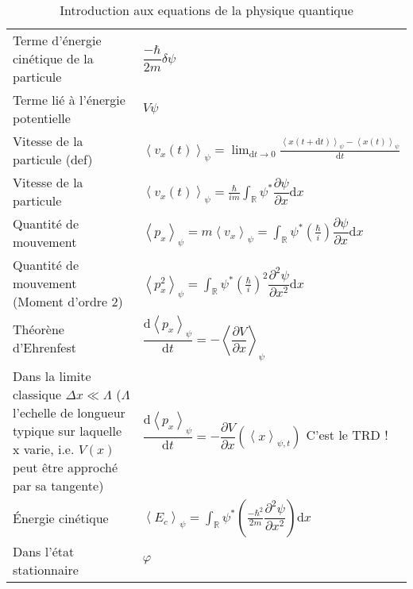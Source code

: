 \documentclass[10pt,a4paper,titlepage,portrait]{article}
\renewcommand{\d}
{
    \mathrm{d}
}
\newcommand*{\dv}[2]
{
    \dfrac{\d#1}{\d#2}
}
\newcommand*{\dpv}[2]
{
    \dfrac{\partial#1}{\partial#2}
}
\newcommand*{\ddpv}[2]
{
    \dfrac{\partial^2#1}{\partial{#2}^2}
}
\newcommand{\av}[2]
{
    \left\langle#1\right\rangle_{#2}
}
\newcommand{\lap}[1]
{
    \delta#1
}
\newcommand{\rint}
{
    \int_{\mathbb{R}}
}
\begin{document}
\begin{center}
\begin{table}[ht]
\begin{tabular}{@{}p{9cm}p{10cm}@{}}
        Terme d'énergie cinétique de la particule & $\dfrac{-\hbar}{2m}\lap{\psi}$ \\
        Terme lié à l'énergie potentielle & $V\psi$ \\
        Vitesse de la particule (def) & $\av{v_x(t)}{\psi} = \displaystyle\lim_{\d t \to0} \frac{\av{x(t+\d t)}{\psi} - \av{x(t)}{\psi}}{\d t}$ \\
        Vitesse de la particule & $\displaystyle \av{v_x(t)}{\psi} = \frac{\hbar}{im}\rint \psi^* \dpv{\psi}{x}\d x$ \\
        Quantité de mouvement & $\displaystyle \av{p_x}{\psi}=m\av{v_x}{\psi}=\rint \psi^* \left(\frac{\hbar}{i}\right) \dpv{\psi}{x}\d x$ \\
        Quantité de mouvement (Moment d'ordre 2) & $\displaystyle \av{p_x^2}{\psi}=\rint \psi^* \left(\frac{\hbar}{i}\right)^2 \ddpv{\psi}{x}\d x$ \\
        Théorène d'Ehrenfest & $\dv{\av{p_x}{\psi}}{t} = -\av{\dpv{V}{x}}{\psi}$ \\
        Dans la limite classique $\Delta x \ll \Lambda $ ($\Lambda$ l'echelle de longueur typique sur laquelle x varie, i.e. $V(x)$ peut être approché par sa tangente) & $\dv{\av{p_x}{\psi}}{t} = -\dpv{V}{x} \left(\av{x}{\psi, t}\right)$ C'est le TRD ! \\
        Énergie cinétique & $\displaystyle \av{E_c}{\psi} = \rint \psi^* \left(\frac{-\hbar^2}{2m}\ddpv{\psi}{x}\right) \d x $\\
        Dans l'état stationnaire & $\varphi $ \\


        \bottomrule
\end{tabular}
\caption{Introduction aux equations de la physique quantique}
\label{tab:quantphis}
\end{table}
    
\end{center}
\end{document}
